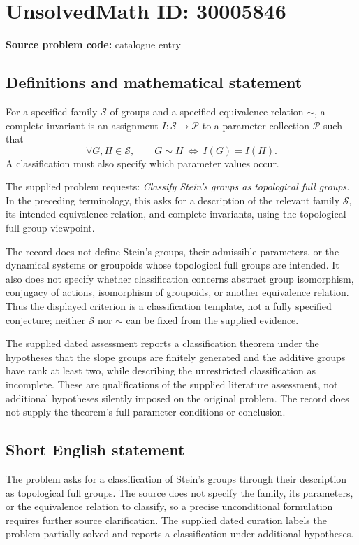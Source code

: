\documentclass[11pt]{article}
\begin{document}
\section*{UnsolvedMath ID: 30005846}
\textbf{Source problem code:} catalogue entry
\subsection{Definitions and mathematical statement}
For a specified family \(\mathcal S\) of groups and a specified equivalence relation \(\sim\), a complete invariant is an assignment \(I\colon\mathcal S\to\mathcal P\) to a parameter collection \(\mathcal P\) such that
\[
\forall G,H\in\mathcal S,\qquad G\sim H\ \Longleftrightarrow\ I(G)=I(H).
\]
A classification must also specify which parameter values occur.

The supplied problem requests: \emph{Classify Stein's groups as topological full groups.} In the preceding terminology, this asks for a description of the relevant family \(\mathcal S\), its intended equivalence relation, and complete invariants, using the topological full group viewpoint.

The record does not define Stein's groups, their admissible parameters, or the dynamical systems or groupoids whose topological full groups are intended. It also does not specify whether classification concerns abstract group isomorphism, conjugacy of actions, isomorphism of groupoids, or another equivalence relation. Thus the displayed criterion is a classification template, not a fully specified conjecture; neither \(\mathcal S\) nor \(\sim\) can be fixed from the supplied evidence.

The supplied dated assessment reports a classification theorem under the hypotheses that the slope groups are finitely generated and the additive groups have rank at least two, while describing the unrestricted classification as incomplete. These are qualifications of the supplied literature assessment, not additional hypotheses silently imposed on the original problem. The record does not supply the theorem's full parameter conditions or conclusion.
\subsection{Short English statement}
The problem asks for a classification of Stein's groups through their description as topological full groups. The source does not specify the family, its parameters, or the equivalence relation to classify, so a precise unconditional formulation requires further source clarification. The supplied dated curation labels the problem partially solved and reports a classification under additional hypotheses.
\end{document}
